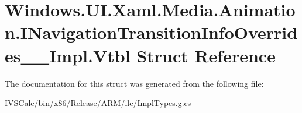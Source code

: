 \hypertarget{struct_windows_1_1_u_i_1_1_xaml_1_1_media_1_1_animation_1_1_i_navigation_transition_info_overrides_____impl_1_1_vtbl}{}\section{Windows.\+U\+I.\+Xaml.\+Media.\+Animation.\+I\+Navigation\+Transition\+Info\+Overrides\+\_\+\+\_\+\+Impl.\+Vtbl Struct Reference}
\label{struct_windows_1_1_u_i_1_1_xaml_1_1_media_1_1_animation_1_1_i_navigation_transition_info_overrides_____impl_1_1_vtbl}


The documentation for this struct was generated from the following file\+:\begin{DoxyCompactItemize}
\item 
I\+V\+S\+Calc/bin/x86/\+Release/\+A\+R\+M/ilc/Impl\+Types.\+g.\+cs\end{DoxyCompactItemize}
